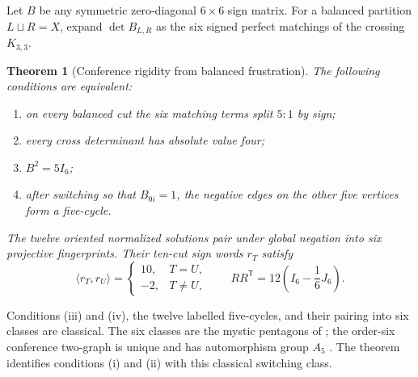\documentclass[11pt]{article}
\newtheorem{theorem}{Theorem}[section]
\theoremstyle{definition}
\theoremstyle{remark}
\begin{document}
Let \(B\) be any symmetric zero-diagonal \(6\times6\) sign matrix.  For a
balanced partition \(L\sqcup R=X\), expand \(\det B_{L,R}\) as the six
signed perfect matchings of the crossing \(K_{3,3}\).

\begin{theorem}[Conference rigidity from balanced frustration]
\label{thm:frustration}
The following conditions are equivalent:
\begin{enumerate}[label=\textup{(\roman*)},leftmargin=*]
\item on every balanced cut the six matching terms split \(5{:}1\) by
sign;
\item every cross determinant has absolute value four;
\item \(B^2=5I_6\);
\item after switching so that \(B_{0i}=1\), the negative edges on the
other five vertices form a five-cycle.
\end{enumerate}
The twelve oriented normalized solutions pair under global negation into
six projective fingerprints.  Their ten-cut sign words \(r_T\) satisfy
\[
 \langle r_T,r_U\rangle=
 \begin{cases}10,&T=U,\\-2,&T\ne U,
 \end{cases}
 \qquad
 RR^{\mathsf T}=12\left(I_6-\frac16J_6\right).
\]
\end{theorem}

Conditions (iii) and (iv), the twelve labelled five-cycles, and their
pairing into six classes are classical.  The six classes are the mystic
pentagons of \cite[Sections~1.1 and~1.6]{HMSVOuter}; the order-six
conference two-graph is unique and has automorphism group \(A_5\)
\cite[Chapters~5--6]{BMS}.  The theorem identifies conditions (i) and (ii)
with this classical switching class.
\end{document}
